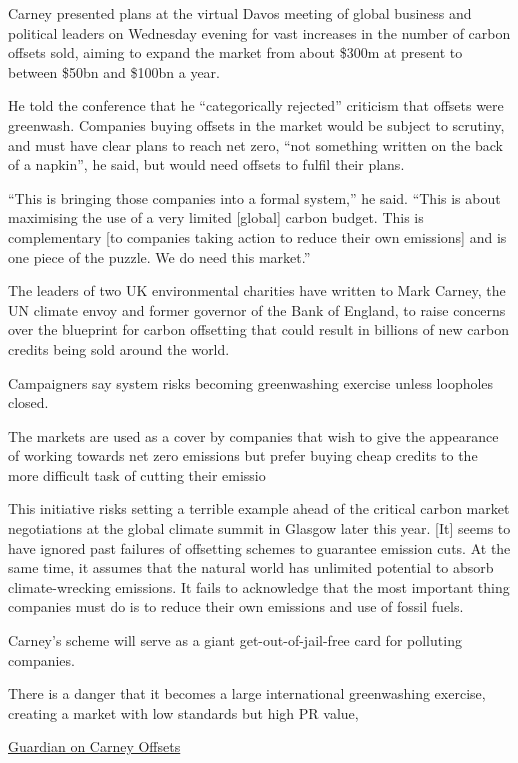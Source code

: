 \documentclass[
]{book}
\begin{document}
Carney presented plans at the virtual Davos meeting of global business and political leaders on Wednesday evening for vast increases in the number of carbon offsets sold, aiming to expand the market from about \$300m at present to between \$50bn and \$100bn a year.

He told the conference that he ``categorically rejected'' criticism that offsets were greenwash. Companies buying offsets in the market would be subject to scrutiny, and must have clear plans to reach net zero, ``not something written on the back of a napkin'', he said, but would need offsets to fulfil their plans.

``This is bringing those companies into a formal system,'' he said. ``This is about maximising the use of a very limited {[}global{]} carbon budget. This is complementary {[}to companies taking action to reduce their own emissions{]} and is one piece of the puzzle. We do need this market.''

The leaders of two UK environmental charities have written to Mark Carney, the UN climate envoy and former governor of the Bank of England, to raise concerns over the blueprint for carbon offsetting that could result in billions of new carbon credits being sold around the world.

Campaigners say system risks becoming greenwashing exercise unless loopholes closed.

The markets are used as a cover by companies that wish to give the appearance of working towards net zero emissions but prefer buying cheap credits to the more difficult task of cutting their emissio

This initiative risks setting a terrible example ahead of the critical carbon market negotiations at the global climate summit in Glasgow later this year. {[}It{]} seems to have ignored past failures of offsetting schemes to guarantee emission cuts. At the same time, it assumes that the natural world has unlimited potential to absorb climate-wrecking emissions. It fails to acknowledge that the most important thing companies must do is to reduce their own emissions and use of fossil fuels.

Carney's scheme will serve as a giant get-out-of-jail-free card for polluting companies.

There is a danger that it becomes a large international greenwashing exercise, creating a market with low standards but high PR value,

\href{https://www.theguardian.com/environment/2021/jan/27/green-groups-raise-concerns-over-carney-carbon-credits-plan}{Guardian on Carney Offsets}
\end{document}
